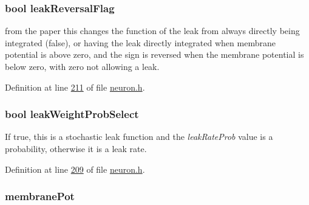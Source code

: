 \hypertarget{structneuron_state_a11691cf6bf906102089c842e78be55fe}{}
\subsubsection[{leak\+Reversal\+Flag}]{\setlength{\rightskip}{0pt plus 5cm}bool leak\+Reversal\+Flag}\label{structneuron_state_a11691cf6bf906102089c842e78be55fe}


from the paper this changes the function of the leak from always directly being integrated (false), or having the leak directly integrated when membrane potential is above zero, and the sign is reversed when the membrane potential is below zero, with zero not allowing a leak. 



Definition at line \hyperlink{neuron_8h_source_l00211}{211} of file \hyperlink{neuron_8h_source}{neuron.\+h}.

\hypertarget{structneuron_state_a20889d9b55895bcc719d6aad2766b8f8}{}
\subsubsection[{leak\+Weight\+Prob\+Select}]{\setlength{\rightskip}{0pt plus 5cm}bool leak\+Weight\+Prob\+Select}\label{structneuron_state_a20889d9b55895bcc719d6aad2766b8f8}


If true, this is a stochastic leak function and the {\itshape leak\+Rate\+Prob} value is a probability, otherwise it is a leak rate. 



Definition at line \hyperlink{neuron_8h_source_l00209}{209} of file \hyperlink{neuron_8h_source}{neuron.\+h}.

\hypertarget{structneuron_state_a0fdd8f44c4105a94e17c4c58a51db486}{}
\subsubsection[{membrane\+Pot}]{ membrane\+Pot}\label{structneuron_state_a0fdd8f44c4105a94e17c4c58a51db486}


